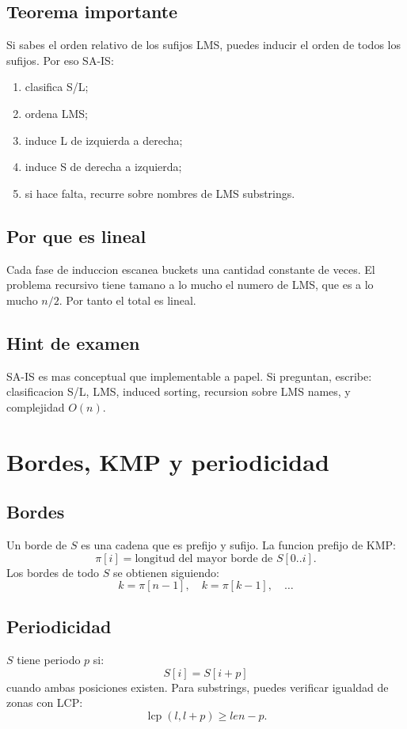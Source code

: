 \documentclass[10pt]{article}
\newcommand{\bigO}{O}
\begin{document}
\subsection{Teorema importante}
Si sabes el orden relativo de los sufijos LMS, puedes inducir el orden de todos
los sufijos. Por eso SA-IS:
\begin{enumerate}[leftmargin=*]
\item clasifica S/L;
\item ordena LMS;
\item induce L de izquierda a derecha;
\item induce S de derecha a izquierda;
\item si hace falta, recurre sobre nombres de LMS substrings.
\end{enumerate}

\subsection{Por que es lineal}
Cada fase de induccion escanea buckets una cantidad constante de veces. El
problema recursivo tiene tamano a lo mucho el numero de LMS, que es a lo mucho
$n/2$. Por tanto el total es lineal.

\subsection{Hint de examen}
SA-IS es mas conceptual que implementable a papel. Si preguntan, escribe:
clasificacion S/L, LMS, induced sorting, recursion sobre LMS names, y
complejidad $\bigO(n)$.

\newpage
\section{Bordes, KMP y periodicidad}

\subsection{Bordes}
Un borde de $S$ es una cadena que es prefijo y sufijo. La funcion prefijo de KMP:
\[
\pi[i]=\text{longitud del mayor borde de }S[0..i].
\]
Los bordes de todo $S$ se obtienen siguiendo:
\[
k=\pi[n-1],\quad k=\pi[k-1],\quad \ldots
\]

\subsection{Periodicidad}
$S$ tiene periodo $p$ si:
\[
S[i]=S[i+p]
\]
cuando ambas posiciones existen. Para substrings, puedes verificar igualdad de
zonas con LCP:
\[
\operatorname{lcp}(l,l+p)\ge len-p.
\]
\end{document}
